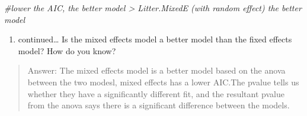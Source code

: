\documentclass[]{article}
\newenvironment{Shaded}{\begin{snugshade}}{\end{snugshade}}
\newcommand{\CommentTok}[1]{\textcolor[rgb]{0.56,0.35,0.01}{\textit{#1}}}
\providecommand{\tightlist}{%
  \setlength{\itemsep}{0pt}\setlength{\parskip}{0pt}}
\begin{document}
\begin{Shaded}
\begin{Highlighting}[]
\CommentTok{#lower the AIC, the better model > Litter.MixedE (with random effect) the better model}
\end{Highlighting}
\end{Shaded}

\begin{enumerate}
\def\labelenumi{\alph{enumi}.}
\setcounter{enumi}{3}
\tightlist
\item
  continued\ldots{} Is the mixed effects model a better model than the
  fixed effects model? How do you know?
\end{enumerate}

\begin{quote}
Answer: The mixed effects model is a better model based on the anova
between the two modesl, mixed effects has a lower AIC.The pvalue tells
us whether they have a significantly different fit, and the resultant
pvalue from the anova says there is a significant difference between the
models.
\end{quote}
\end{document}
